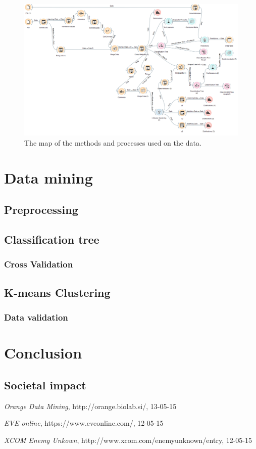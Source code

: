 \documentclass[a4paper,11pt]{article}
\begin{document}
\begin{figure}[h]
	\centering
	\includegraphics[scale=0.35]{orangeMap}
	\caption{The map of the methods and processes used on the data.}
	\label{OrangeMap}
\end{figure}


\section{Data mining}
\subsection{Preprocessing}
\subsection{Classification tree}
\subsubsection{Cross Validation}
\subsection{K-means Clustering}
\subsubsection{Data validation}

\section{Conclusion}
\subsection{Societal impact}




\appendix
\begin{thebibliography}{9}

  \emph{Orange Data Mining},
  http://orange.biolab.si/,
  13-05-15
  
  \emph{EVE online},
  https://www.eveonline.com/,
  12-05-15

  \emph{XCOM Enemy Unkown},
  http://www.xcom.com/enemyunknown/entry,
  12-05-15 
\end{thebibliography}
\end{document}
